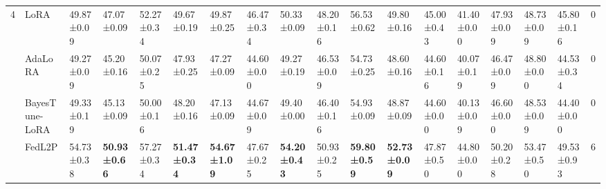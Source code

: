 \begin{table*}[t]
\begin{scriptsize}
{\begin{tabular}{c|l|l|l|l|l|l|l|l|l|l|l|l|l|l|l|l|c}
\multirow{5}{*}{4}  & LoRA                                   & 49.87±0.09                       & 47.07±0.09                       & 52.27±0.34                       & 49.67±0.19                       & 49.87±0.25                       & 46.47±0.34                       & 50.33±0.09                       & 48.20±0.16                        & 56.53±0.62                       & 49.80±0.16                        & 45.00±0.43                        & 41.40±0.00                        & 47.93±0.09                       & 48.73±0.09                       & 45.80±0.16                        & 0             \\ %
                    & AdaLoRA                              & 49.27±0.09                       & 45.20±0.16                        & 50.07±0.25                       & 47.93±0.25                       & 47.27±0.09                       & 44.60±0.00                        & 49.27±0.19                       & 46.53±0.09                       & 54.73±0.25                       & 48.60±0.16                        & 44.60±0.16                        & 40.07±0.19                       & 46.47±0.09                       & 48.80±0.00                        & 44.53±0.34                       & 0             \\ %
                    & BayesTune-LoRA                            & 49.33±0.19                       & 45.13±0.09                       & 50.00±0.16                        & 48.20±0.16                        & 47.13±0.09                       & 44.67±0.09                       & 49.40±0.00                        & 46.40±0.16                        & 54.93±0.09                       & 48.87±0.09                       & 44.60±0.00                        & 40.13±0.09                       & 46.60±0.00                        & 48.53±0.09                       & 44.40±0.00                        & 0             \\ %
                    & FedL2P                               & 54.73±0.38                       & \textbf{50.93±0.66}              & 57.27±0.34                       & \textbf{51.47±0.34}              & \textbf{54.67±1.09}              & 47.67±0.25                       & \textbf{54.20±0.43}               & 50.93±0.25                       & \textbf{59.80±0.59}               & \textbf{52.73±0.09}              & 47.87±0.50                       & 44.80±0.00                        & 50.20±0.28                        & 53.47±0.50                       & 49.53±0.93                       & 6             \\ %

\end{tabular}}
\end{scriptsize}
\end{table*}
